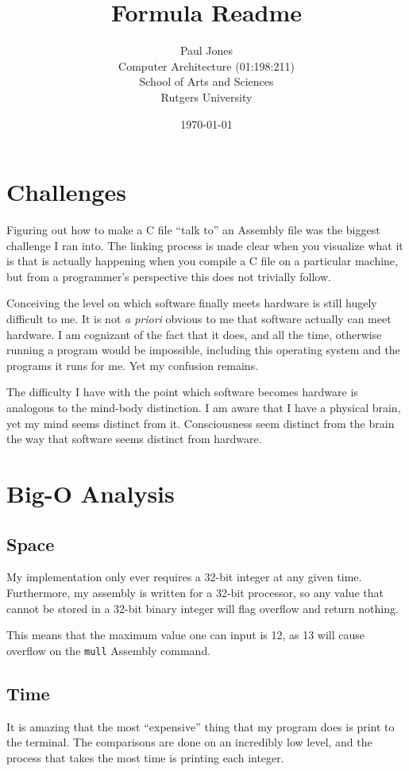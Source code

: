 \documentclass{article}
\title{Formula Readme}
\date{\today}
\author{Paul Jones\\ Computer Architecture (01:198:211) \\ School of Arts and Sciences \\ Rutgers University}
\begin{document}
\maketitle



\section{Challenges}

Figuring out how to make a C file ``talk to'' an Assembly file was the biggest challenge I ran into.
The linking process is made clear when you visualize what it is that is actually happening when 
you compile a C file on a particular machine, but from a programmer's perspective this does not
trivially follow.

Conceiving the level on which software finally meets hardware is still hugely difficult to me.
It is not \emph{a priori} obvious to me that software actually can meet hardware.
I am cognizant of the fact that it does, and all the time, otherwise running a program would be impossible,
including this operating system and the programs it runs for me.
Yet my confusion remains.

The difficulty I have with the point which software becomes hardware is analogous to the mind-body distinction.
I am aware that I have a physical brain, yet my mind seems distinct from it.
Consciousness seem distinct from the brain the way that software seems distinct from hardware.


\section{Big-O Analysis}

\subsection{Space}

My implementation only ever requires a 32-bit integer at any given time.
Furthermore, my assembly is written for a 32-bit processor, so any value that cannot be stored
in a 32-bit binary integer will flag overflow and return nothing.

This means that the maximum value one can input is 12, as 13 will cause overflow on the \texttt{mull}
Assembly command.

\subsection{Time}

It is amazing that the most ``expensive'' thing that my program does is print to the terminal.
The comparisons are done on an incredibly low level, and the process that takes the most time
is printing each integer.
\end{document}
